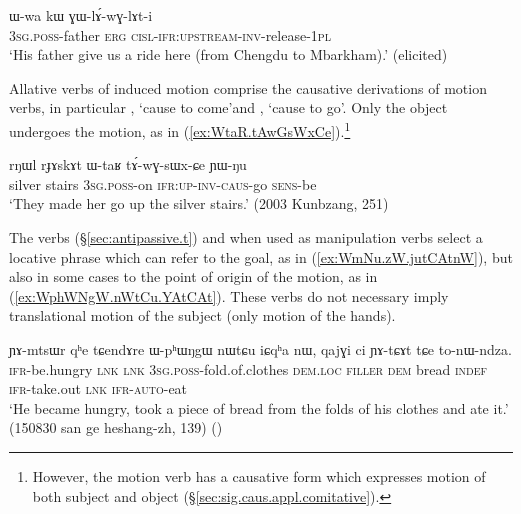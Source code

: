 \begin{exe}
\ex \label{ex:GWlAwGlAti}
\gll  ɯ-wa kɯ ɣɯ-lɤ́-wɣ-lɤt-i \\
\textsc{3sg}.\textsc{poss}-father \textsc{erg} \textsc{cisl}-\textsc{ifr}:\textsc{upstream}-\textsc{inv}-release-\textsc{1pl} \\
\glt `His father give us a ride here (from Chengdu to Mbarkham).' (elicited)
\end{exe}

Allative verbs of induced motion comprise the causative derivations of motion verbs, in particular , `cause to come'and , `cause to go'. Only the object undergoes the motion, as in (\ref{ex:WtaR.tAwGsWxCe}).\footnote{However, the motion verb  has a causative form  which expresses motion of both subject and object (§\ref{sec:sig.caus.appl.comitative}). }

\begin{exe}
\ex \label{ex:WtaR.tAwGsWxCe}
\gll rŋɯl rɟɤskɤt ɯ-taʁ tɤ́-wɣ-sɯx-ɕe ɲɯ-ŋu \\
silver stairs \textsc{3sg}.\textsc{poss}-on \textsc{ifr}:\textsc{up}-\textsc{inv}-\textsc{caus}-go \textsc{sens}-be \\
\glt `They made her go up the silver stairs.' (2003 Kunbzang, 251)
\end{exe}


The verbs  (§\ref{sec:antipassive.t}) and  when used as manipulation verbs select a locative phrase which can refer to the goal, as in (\ref{ex:WmNu.zW.jutCAtnW}), but also in some cases to the point of origin of the motion, as in (\ref{ex:WphWNgW.nWtCu.YAtCAt}). These verbs do not necessary imply translational motion of the subject (only motion of the hands).

\begin{exe}
\ex \label{ex:WphWNgW.nWtCu.YAtCAt}
\gll ɲɤ-mtsɯr qʰe tɕendɤre ɯ-pʰɯŋgɯ nɯtɕu iɕqʰa nɯ, qajɣi ci ɲɤ-tɕɤt tɕe to-nɯ-ndza. \\
\textsc{ifr}-be.hungry \textsc{lnk} \textsc{lnk} \textsc{3sg}.\textsc{poss}-fold.of.clothes \textsc{dem}.\textsc{loc} \textsc{filler} \textsc{dem} bread \textsc{indef} \textsc{ifr}-take.out \textsc{lnk} \textsc{ifr}-\textsc{auto}-eat \\
\glt `He became hungry, took a piece of bread from the folds of his clothes and ate it.' (150830 san ge heshang-zh, 139) ()
\end{exe}

